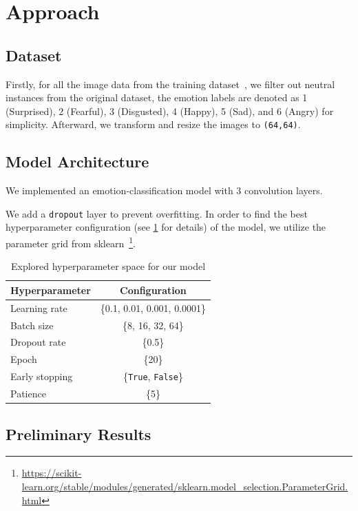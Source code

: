 \section{Approach}
\label{sec:approach}

\subsection{Dataset}
Firstly, 
for all the image data from the training dataset~\cite{li2017reliable,li2019reliable}, 
we filter out neutral instances from the original dataset, 
the emotion labels are denoted as 1 (Surprised), 2 (Fearful), 3 (Disgusted), 4 (Happy), 5 (Sad), and 6 (Angry) for simplicity. 
Afterward, 
we transform and resize the images to \texttt{(64,64)}. 

\subsection{Model Architecture}
We implemented an emotion-classification model with 3 convolution layers.

We add a \texttt{dropout} layer to prevent overfitting. 
In order to find the best hyperparameter configuration (see \cref{tab:hyper} for details) of the model, 
we utilize the parameter grid from sklearn~\footnote{\url{https://scikit-learn.org/stable/modules/generated/sklearn.model_selection.ParameterGrid.html}}. 


\begin{table}
    \centering
    \begin{tabular}{@{}lc@{}}
      \toprule
      Hyperparameter & Configuration \\
      \midrule
      Learning rate & \{0.1, 0.01, 0.001, 0.0001\}  \\
      Batch size & \{8, 16, 32, 64\} \\
      Dropout rate & \{0.5\} \\
      Epoch & \{20\} \\
      Early stopping & \{\texttt{True}, \texttt{False}\} \\
      Patience & \{5\} \\
      \bottomrule
    \end{tabular}
    \caption{Explored hyperparameter space for our model}
    \label{tab:hyper}
  \end{table}

\subsection{Preliminary Results}

